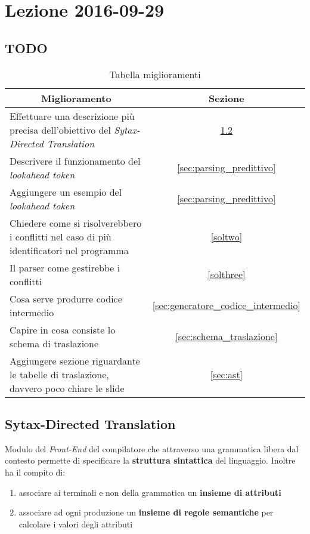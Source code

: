\section{Lezione 2016-09-29}
\subsection{TODO}
\begin{table}[H]
\begin{center}
\begin{tabular}{|p{\textwidth}|c|}
\hline
\multicolumn{1}{|c|}{\textbf{Miglioramento}} & \textbf{Sezione} \\ \hline
Effettuare una descrizione più precisa dell'obiettivo del
\textit{Sytax-Directed Translation} &
\ref{sec:syntax-directed_translation}\\ \hline
Descrivere il funzionamento del \textit{lookahead token} &
\ref{sec:parsing_predittivo} \\ \hline
Aggiungere un esempio del \textit{lookahead token} &
\ref{sec:parsing_predittivo} \\ \hline
Chiedere come si risolverebbero i conflitti nel caso di più identificatori nel
programma & \ref{soltwo} \\ \hline
Il parser come gestirebbe i conflitti & \ref{solthree} \\ \hline
Cosa serve produrre codice intermedio
& \ref{sec:generatore_codice_intermedio} \\ \hline
Capire in cosa consiste lo schema di traslazione &
\ref{sec:schema_traslazione} \\ \hline
Aggiungere sezione riguardante le tabelle di traslazione, davvero poco chiare
le slide & \ref{sec:ast} \\ \hline
\end{tabular}
\end{center}
\caption{Tabella miglioramenti}
\label{tab:tab_todo}
\end{table}

\subsection{Sytax-Directed Translation}
\label{sec:syntax-directed_translation}
Modulo del \textit{Front-End} del compilatore che attraverso una grammatica
libera dal contesto permette di specificare la \textbf{struttura sintattica} del
linguaggio. Inoltre ha il compito di:
\begin{enumerate}
\item associare ai terminali e non della grammatica un \textbf{insieme di
attributi}
\item associare ad ogni produzione un \textbf{insieme di regole semantiche} per
calcolare i valori degli attributi
\end{enumerate}

